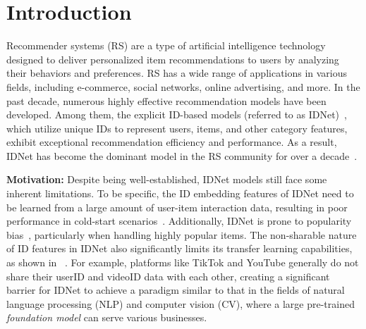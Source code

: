 \documentclass[sigconf]{acmart}
\begin{document}
\maketitle
		
	\section{Introduction}

Recommender systems (RS) are a type of artificial intelligence technology designed to deliver personalized item recommendations to users by analyzing their behaviors and preferences. RS has a wide range of applications in various fields, including e-commerce, social networks, online advertising, and more. In the past decade, numerous highly effective recommendation models have been developed. Among them, the explicit ID-based models (referred  to  as IDNet)~\cite{koren2009matrix,rendle2010factorization}, which utilize unique IDs to represent users, items, and other category features, exhibit exceptional recommendation efficiency and performance. As a result, IDNet has become the dominant model in the RS community for over a decade~\cite{yuan2023go}.
 
 
\textbf{Motivation:} Despite being well-established,  IDNet models still face  some inherent limitations. To be specific, the ID embedding features of IDNet need to be learned from a large amount of user-item interaction data, resulting in poor performance in cold-start scenarios~\cite{he2016vbpr}.  Additionally, IDNet is prone to popularity bias~\cite{abdollahpouri2019managing}, particularly when handling highly popular items. 
 The non-sharable nature of ID features in IDNet also significantly limits its transfer learning capabilities, as shown in ~\cite{ding2021zero,wang2022transrec,hou2022towards}.
 For example, platforms like TikTok and YouTube generally  do not share their userID and videoID data with each other, creating  a significant barrier  for IDNet to achieve a paradigm similar to that in the fields of natural language processing (NLP) and computer vision (CV), where a large pre-trained  \textit{foundation model} can serve various businesses.
 
\end{document}
